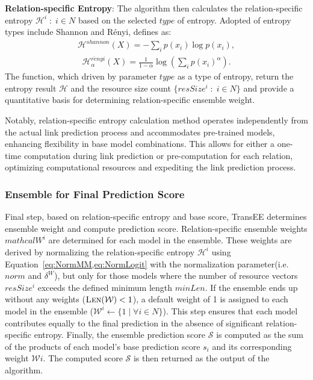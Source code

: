 \documentclass{article}
\begin{document}
\egroup
\textbf{Relation-specific Entropy}: The algorithm then calculates the relation-specific entropy ${\mathcal{H}^{i} \;:\; i \in N}$ based on the selected $type$ of entropy. Adopted of entropy types include Shannon and Rényi, defines as:
\begin{align}
    \label{eq:shannon}
    \mathcal{H}^{shannon}(X) = -\sum_{i} p(x_i) \log p(x_i), 
\end{align}%
\begin{align}
    \label{eq:Rényi}    
    \mathcal{H}_{\alpha}^{r\acute{e}nyi}(X) = \frac{1}{1-\alpha} \log \left( \sum_{i} p(x_i)^\alpha \right).
\end{align}%
The function, which driven by parameter $type$ as a type of entropy, return the entropy result $\mathcal{H}$ and the resource size count $\{resSize^{i} \;:\; i \in N\}$ and provide a quantitative basis for determining relation-specific ensemble weight. 

Notably, relation-specific entropy calculation method operates independently from the actual link prediction process and accommodates pre-trained models, enhancing flexibility in base model combinations. This allows for either a one-time computation during link prediction or pre-computation for each relation, optimizing computational resources and expediting the link prediction process.

\subsubsection{Ensemble for Final Prediction Score}
Final step, based on relation-specific entropy and base score, TransEE determines ensemble weight and compute prediction score. Relation-specific ensemble weights $mathcal{W}^i$ are determined for each model in the ensemble. These weights are derived by normalizing the relation-specific entropy $\mathcal{H}^i$ using Equation~\ref{eq:NormMM,eq:NormLogit} with the normalization parameter(i.e. $norm$ and $\delta^{W}$), but only for those models where the number of resource vectors \(resSize^{i}\) exceeds the defined minimum length \(minLen\). If the ensemble ends up without any weights (\(\Call{Len}{\mathcal{W}} < 1\)), a default weight of 1 is assigned to each model in the ensemble (\(\mathcal{W}^i \leftarrow \{1\;|\; \forall i \in N\}\)). This step ensures that each model contributes equally to the final prediction in the absence of significant relation-specific entropy. Finally, the ensemble prediction score \(\mathcal{S}\) is computed as the sum of the products of each model's base prediction score \(s\acute{}_i\) and its corresponding weight \(\mathcal{W}i\). The computed score \(\mathcal{S}\) is then returned as the output of the algorithm.
\end{document}
